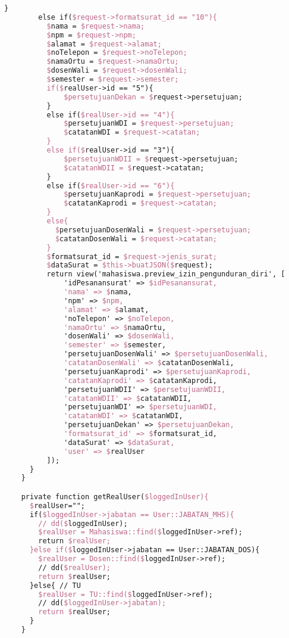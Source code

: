 \begin{lstlisting}[language=tex,basicstyle=\tiny,caption=PesanansuratController.php]
        }
        else if($request->formatsurat_id == "10"){
          $nama = $request->nama;
          $npm = $request->npm;
          $alamat = $request->alamat;
          $noTelepon = $request->noTelepon;
          $namaOrtu = $request->namaOrtu;
          $dosenWali = $request->dosenWali;
          $semester = $request->semester;
          if($realUser->id == "5"){
              $persetujuanDekan = $request->persetujuan;
          }
          else if($realUser->id == "4"){
              $persetujuanWDI = $request->persetujuan;
              $catatanWDI = $request->catatan;
          }
          else if($realUser->id == "3"){
              $persetujuanWDII = $request->persetujuan;
              $catatanWDII = $request->catatan;
          }
          else if($realUser->id == "6"){
              $persetujuanKaprodi = $request->persetujuan;
              $catatanKaprodi = $request->catatan;
          }
          else{
            $persetujuanDosenWali = $request->persetujuan;
            $catatanDosenWali = $request->catatan;
          }
          $formatsurat_id = $request->jenis_surat;
          $dataSurat = $this->buatJSON($request);
          return view('mahasiswa.preview_izin_pengunduran_diri', [
              'idPesanansurat' => $idPesanansurat,
              'nama' => $nama,
              'npm' => $npm,
              'alamat' => $alamat,
              'noTelepon' => $noTelepon,
              'namaOrtu' => $namaOrtu,
              'dosenWali' => $dosenWali,
              'semester' => $semester,
              'persetujuanDosenWali' => $persetujuanDosenWali,
              'catatanDosenWali' => $catatanDosenWali,
              'persetujuanKaprodi' => $persetujuanKaprodi,
              'catatanKaprodi' => $catatanKaprodi,
              'persetujuanWDII' => $persetujuanWDII,
              'catatanWDII' => $catatanWDII,
              'persetujuanWDI' => $persetujuanWDI,
              'catatanWDI' => $catatanWDI,
              'persetujuanDekan' => $persetujuanDekan,
              'formatsurat_id' => $formatsurat_id,
              'dataSurat' => $dataSurat,
              'user' => $realUser
          ]);
      }
    }

    private function getRealUser($loggedInUser){
      $realUser="";
      if($loggedInUser->jabatan == User::JABATAN_MHS){
        // dd($loggedInUser);
        $realUser = Mahasiswa::find($loggedInUser->ref);
        return $realUser;
      }else if($loggedInUser->jabatan == User::JABATAN_DOS){
        $realUser = Dosen::find($loggedInUser->ref);
        // dd($realUser);
        return $realUser;
      }else{ // TU
        $realUser = TU::find($loggedInUser->ref);
        // dd($loggedInUser->jabatan);
        return $realUser;
      }
    }


\end{lstlisting}
